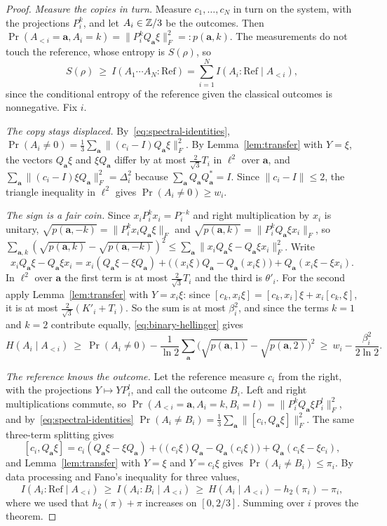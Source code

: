\begin{proof}
\emph{Measure the copies in turn.} Measure $c_1,\dots,c_N$ in turn on the system, with the projections $P_i^k$, and let $A_i\in\mathbb Z/3$ be the outcomes.
Then $\Pr(A_{<i}=\mathbf a,A_i=k)=\|P_i^kQ_{\mathbf a}\xi\|_F^2=:p(\mathbf a,k)$. The measurements do not touch the reference, whose entropy is
$S(\rho)$, so
\[
S(\rho)\ \ge\ I(A_1\cdots A_N:\mathrm{Ref})=\sum_{i=1}^NI(A_i:\mathrm{Ref}\mid A_{<i}),
\]
since the conditional entropy of the reference given the classical outcomes is nonnegative. Fix $i$.

\emph{The copy stays displaced.} By~\eqref{eq:spectral-identities}, $\Pr(A_i\ne0)=\frac13\sum_{\mathbf a}\|(c_i-I)Q_{\mathbf a}\xi\|_F^2$. By
Lemma~\ref{lem:transfer} with $Y=\xi$, the vectors $Q_{\mathbf a}\xi$ and $\xi Q_{\mathbf a}$ differ by at most $\frac2{\sqrt3}T_i$ in $\ell^2$ over $\mathbf a$,
and $\sum_{\mathbf a}\|(c_i-I)\xi Q_{\mathbf a}\|_F^2=\Delta_i^2$ because $\sum_{\mathbf a}Q_{\mathbf a}Q_{\mathbf a}^*=I$. Since $\|c_i-I\|\le2$, the triangle
inequality in $\ell^2$ gives $\Pr(A_i\ne0)\ge w_i$.

\emph{The sign is a fair coin.} Since $x_iP_i^kx_i=P_i^{-k}$ and right multiplication by $x_i$ is unitary,
$\sqrt{p(\mathbf a,-k)}=\|P_i^kx_iQ_{\mathbf a}\xi\|_F$ and $\sqrt{p(\mathbf a,k)}=\|P_i^kQ_{\mathbf a}\xi x_i\|_F$, so
$\sum_{\mathbf a,k}(\sqrt{p(\mathbf a,k)}-\sqrt{p(\mathbf a,-k)})^2\le\sum_{\mathbf a}\|x_iQ_{\mathbf a}\xi-Q_{\mathbf a}\xi x_i\|_F^2$. Write
\[
x_iQ_{\mathbf a}\xi-Q_{\mathbf a}\xi x_i=x_i(Q_{\mathbf a}\xi-\xi Q_{\mathbf a})+\bigl((x_i\xi)Q_{\mathbf a}-Q_{\mathbf a}(x_i\xi)\bigr)+Q_{\mathbf a}(x_i\xi-\xi x_i).
\]
In $\ell^2$ over $\mathbf a$ the first term is at most $\frac2{\sqrt3}T_i$ and the third is $\theta'_i$. For the second apply Lemma~\ref{lem:transfer} with
$Y=x_i\xi$: since $[c_k,x_i\xi]=[c_k,x_i]\xi+x_i[c_k,\xi]$, it is at most $\frac2{\sqrt3}(K'_i+T_i)$. So the sum is at most $\beta_i^2$, and since the
terms $k=1$ and $k=2$ contribute equally, \eqref{eq:binary-hellinger} gives
\[
H(A_i\mid A_{<i})\ \ge\ \Pr(A_i\ne0)-\frac1{\ln2}\sum_{\mathbf a}\bigl(\sqrt{p(\mathbf a,1)}-\sqrt{p(\mathbf a,2)}\bigr)^2\ \ge\ w_i-\frac{\beta_i^2}{2\ln2}.
\]

\emph{The reference knows the outcome.} Let the reference measure $c_i$ from the right, with the projections $Y\mapsto YP_i^l$, and call the outcome
$B_i$. Left and right multiplications commute, so $\Pr(A_{<i}=\mathbf a,A_i=k,B_i=l)=\|P_i^kQ_{\mathbf a}\xi P_i^l\|_F^2$, and
by~\eqref{eq:spectral-identities} $\Pr(A_i\ne B_i)=\frac13\sum_{\mathbf a}\|[c_i,Q_{\mathbf a}\xi]\|_F^2$. The same three-term splitting gives
\[
[c_i,Q_{\mathbf a}\xi]=c_i(Q_{\mathbf a}\xi-\xi Q_{\mathbf a})+\bigl((c_i\xi)Q_{\mathbf a}-Q_{\mathbf a}(c_i\xi)\bigr)+Q_{\mathbf a}(c_i\xi-\xi c_i),
\]
and Lemma~\ref{lem:transfer} with $Y=\xi$ and $Y=c_i\xi$ gives $\Pr(A_i\ne B_i)\le\pi_i$. By data processing and Fano's inequality for three values,
\[
I(A_i:\mathrm{Ref}\mid A_{<i})\ \ge\ I(A_i:B_i\mid A_{<i})\ \ge\ H(A_i\mid A_{<i})-h_2(\pi_i)-\pi_i ,
\]
where we used that $h_2(\pi)+\pi$ increases on $[0,2/3]$. Summing over $i$ proves the theorem.
\end{proof}


